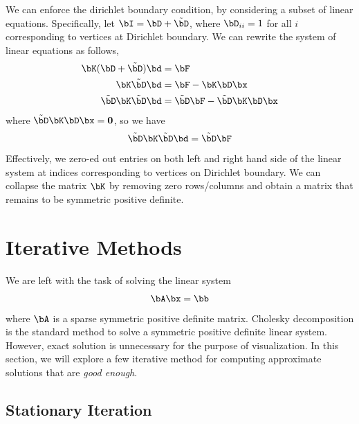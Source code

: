 \documentclass[11pt,titlepage]{article}
\begin{document}
We can enforce the dirichlet boundary condition, by considering a subset of linear equations. Specifically, let $\bI = \bD + \tilde{\bD}$, where $\bD_{ii} = 1$ for all $i$ corresponding to vertices at Dirichlet boundary. We can rewrite the system of linear equations as follows,
\begin{align*}
    \bK(\bD + \tilde{\bD}) \bd 
        &= \bF \\
    \bK \tilde{\bD} \bd 
        &= \bF - \bK\bD \bx \\
    \tilde{\bD} \bK \tilde{\bD} \bd 
        &= \tilde{\bD} \bF - \tilde{\bD} \bK\bD \bx
\end{align*}
where $\tilde{\bD} \bK\bD \bx = \mathbf{0}$, so we have
\[
    \tilde{\bD} \bK \tilde{\bD}\bd
    = \tilde{\bD} \bF
\]
Effectively, we zero-ed out entries on both left and right hand side of the linear system at indices corresponding to vertices on Dirichlet boundary. We can collapse the matrix $\bK$ by removing zero rows/columns and obtain a matrix that remains to be symmetric positive definite.

\section{Iterative Methods} 

We are left with the task of solving the linear system
\[
    \bA\bx = \bb
\]
where $\bA$ is a sparse symmetric positive definite matrix. Cholesky decomposition is the standard method to solve a symmetric positive definite linear system. However, exact solution is unnecessary for the purpose of visualization. In this section, we will explore a few iterative method for computing approximate solutions that are \textit{good enough}.

\subsection{Stationary Iteration}
\end{document}
